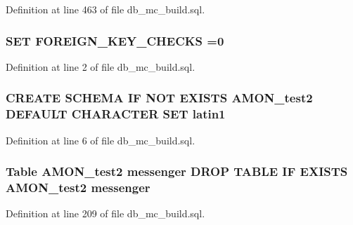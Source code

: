 Definition at line 463 of file db\-\_\-mc\-\_\-build.\-sql.

\hypertarget{db__mc__build_8sql_a35e8144ba9b677eb577b84f0a7366c98}{
\subsubsection[{F\-O\-R\-E\-I\-G\-N\-\_\-\-K\-E\-Y\-\_\-\-C\-H\-E\-C\-K\-S}]{\setlength{\rightskip}{0pt plus 5cm}S\-E\-T F\-O\-R\-E\-I\-G\-N\-\_\-\-K\-E\-Y\-\_\-\-C\-H\-E\-C\-K\-S =0}}\label{db__mc__build_8sql_a35e8144ba9b677eb577b84f0a7366c98}


Definition at line 2 of file db\-\_\-mc\-\_\-build.\-sql.

\hypertarget{db__mc__build_8sql_a145c9c55e2feb6e7b5660e2d330c2e3d}{
\subsubsection[{latin1}]{\setlength{\rightskip}{0pt plus 5cm}C\-R\-E\-A\-T\-E S\-C\-H\-E\-M\-A I\-F N\-O\-T E\-X\-I\-S\-T\-S {\bf A\-M\-O\-N\-\_\-test2} D\-E\-F\-A\-U\-L\-T C\-H\-A\-R\-A\-C\-T\-E\-R S\-E\-T latin1}}\label{db__mc__build_8sql_a145c9c55e2feb6e7b5660e2d330c2e3d}


Definition at line 6 of file db\-\_\-mc\-\_\-build.\-sql.

\hypertarget{db__mc__build_8sql_acb316bd3c76edcc7d70ffc6d3b6b9ba6}{
\subsubsection[{messenger}]{\setlength{\rightskip}{0pt plus 5cm}Table {\bf A\-M\-O\-N\-\_\-test2} messenger D\-R\-O\-P T\-A\-B\-L\-E I\-F E\-X\-I\-S\-T\-S {\bf A\-M\-O\-N\-\_\-test2} messenger}}\label{db__mc__build_8sql_acb316bd3c76edcc7d70ffc6d3b6b9ba6}


Definition at line 209 of file db\-\_\-mc\-\_\-build.\-sql.

